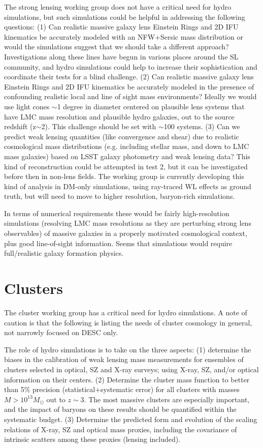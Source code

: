 \documentclass[11pt, margin=1in]{article}
\begin{document}
The strong lensing working group does not have a critical need for hydro simulations, but such simulations could be helpful in
addressing the following questions:
%
(1) Can realistic massive galaxy lens Einstein Rings and 2D IFU kinematics be accurately modeled with an NFW+Sersic mass distribution or would the simulations suggest that we should take a different approach? Investigations along these lines have begun in various places around the SL community, and hydro simulations could help to increase their sophistication and coordinate their tests for a blind challenge.
%
(2) Can realistic massive galaxy lens Einstein Rings and 2D IFU kinematics be accurately modeled in the presence of confounding realistic local and line of sight mass environments? Ideally we would use light cones $\sim$1 degree in diameter centered on plausible lens systems that have LMC mass resolution and plausible hydro galaxies, out to the source redshift (z$\sim$2). This challenge should be set with $\sim$100 systems.
%
(3) Can we predict weak lensing quantities (like convergence and shear) due to realistic cosmological mass distributions (e.g. including stellar mass, and down to LMC mass galaxies) based on LSST galaxy photometry and weak lensing data? This kind of reconstruction could be attempted in test 2, but it can be investigated before then in non-lens fields. The working group is currently developing this kind of analysis in DM-only simulations, using ray-traced WL effects as ground truth, but will need to move to higher resolution, baryon-rich simulations.

In terms of numerical requirements these would be fairly high-resolution simulations (resolving LMC mass resolutions as they are perturbing strong lens observables) of massive galaxies in a properly motivated cosmological context, plus good line-of-sight information.  Seems that simulations would require full/realistic galaxy formation physics.


\section{Clusters}

The cluster working group has a critical need for hydro simulations.  A note of caution is that the following is listing
the needs of cluster cosmology in general, not narrowly focused on DESC only.

The role of hydro simulations is to take on the three aspects:
(1) determine the biases in the calibration of weak lensing mass measurements for ensembles of clusters
selected in optical, SZ and X-ray surveys; using X-ray, SZ, and/or optical information on their centers.
%
(2) Determine the cluster mass function to better than 5\% precision (statistical+systematic error) for
all clusters with masses $M > 10^{13} M_{\odot}$ out to $z \sim 3$. The most massive clusters are especially important,
and the impact of baryons on these results should be quantified within the systematic budget.
%
(3) Determine the predicted form and evolution of the scaling relations of X-ray, SZ and optical mass proxies,
including the covariance of intrinsic scatters among these proxies (lensing included). 
\end{document}
